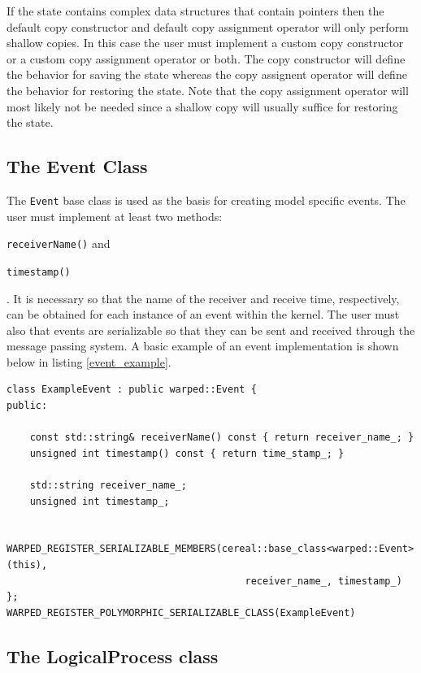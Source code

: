 \documentclass[11pt]{book}
\begin{document}
If the state contains complex data structures that contain pointers then the default copy
constructor and default copy assignment operator will only perform shallow copies.  In this
case the user must implement a custom copy constructor or a custom copy assignment operator
or both.  The copy constructor will define the behavior for saving the state whereas the
copy assignent operator will define the behavior for restoring the state.  Note that the
copy assignment operator will most likely not be needed since a shallow copy will usually
suffice for restoring the state.

\subsection{The Event Class}

The \texttt{Event} base class is used as the basis for creating model specific events.  The user must
implement at least two methods: \begin{inparaenum}[(1)] \item \texttt{receiverName()} and 
\item \texttt{timestamp()} \end{inparaenum}.  It is necessary so that the name of the receiver
and receive time, respectively, can be obtained for each instance of an event within the kernel.
The user must also that events are serializable so that they can be sent and received through
the message passing system.  A basic example of an event implementation is shown below in listing
\ref{event_example}.

\begin{lstlisting}[caption=Example \textsc{warped2} Event Definition, label=event_example, float]
class ExampleEvent : public warped::Event {
public:

    const std::string& receiverName() const { return receiver_name_; }
    unsigned int timestamp() const { return time_stamp_; }

    std::string receiver_name_;
    unsigned int timestamp_;

    WARPED_REGISTER_SERIALIZABLE_MEMBERS(cereal::base_class<warped::Event>(this),
                                         receiver_name_, timestamp_)
};
WARPED_REGISTER_POLYMORPHIC_SERIALIZABLE_CLASS(ExampleEvent)
\end{lstlisting}

\subsection{The LogicalProcess class}
\end{document}
